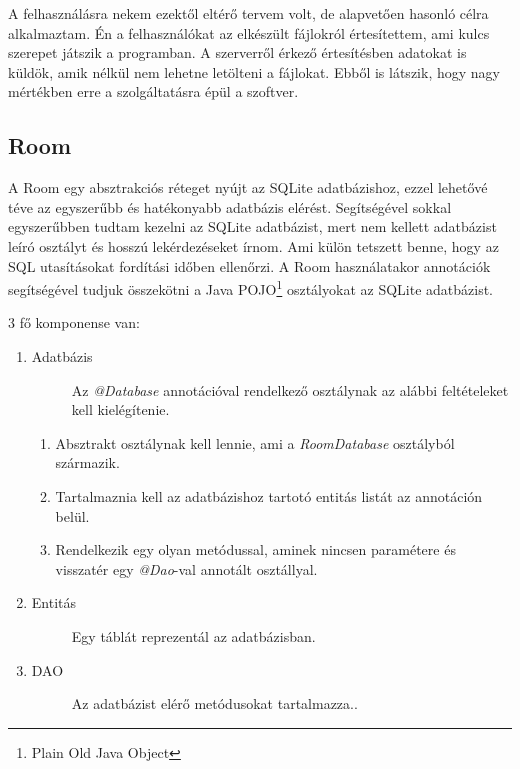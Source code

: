 \documentclass{thesis-ekf}
\theoremstyle{definition}
\theoremstyle{remark}
\begin{document}
A felhasználásra nekem ezektől eltérő tervem volt, de alapvetően hasonló célra alkalmaztam.
Én a felhasználókat az elkészült fájlokról értesítettem, ami kulcs szerepet játszik a programban.
A szerverről érkező értesítésben adatokat is küldök, amik nélkül nem lehetne letölteni a fájlokat.
Ebből is látszik, hogy nagy mértékben erre a szolgáltatásra épül a szoftver.

\subsection{Room}

A Room egy absztrakciós réteget nyújt az SQLite adatbázishoz, ezzel lehetővé téve az egyszerűbb és hatékonyabb adatbázis elérést.
Segítségével sokkal egyszerűbben tudtam kezelni az SQLite adatbázist, mert nem kellett adatbázist leíró osztályt és hosszú lekérdezéseket írnom.
Ami külön tetszett benne, hogy az SQL utasításokat fordítási időben ellenőrzi. 
A Room használatakor annotációk segítségével tudjuk összekötni a Java POJO\footnote{Plain Old Java Object} osztályokat az SQLite adatbázist.

3 fő komponense van:

\begin{enumerate}
	\item
	\begin{description}
		\item[Adatbázis] Az \emph{@Database} annotációval rendelkező osztálynak az alábbi feltételeket kell kielégítenie.
	\end{description}
	\begin{enumerate}
		\item Absztrakt osztálynak kell lennie, ami a \emph{RoomDatabase} osztályból származik.
		\item Tartalmaznia kell az adatbázishoz tartotó entitás listát az annotáción belül.
		\item Rendelkezik egy olyan metódussal, aminek nincsen paramétere és visszatér egy \emph{@Dao}-val annotált osztállyal.
	\end{enumerate}
	\item
	\begin{description}
		\item[Entitás] Egy táblát reprezentál az adatbázisban.
	\end{description}
	\item
	\begin{description}
		\item[DAO] Az adatbázist elérő metódusokat tartalmazza..
	\end{description}
\end{enumerate}
\end{document}
